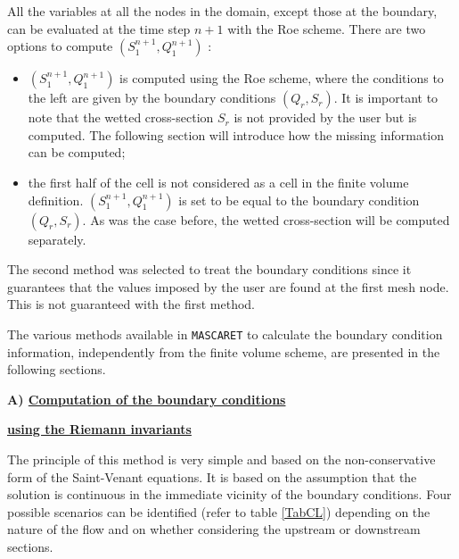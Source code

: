 All the variables at all the nodes in the domain, except those at the boundary, can be evaluated at the time step $n+1$ with the Roe scheme. There are two options to compute $(S_{1}^{n+1},Q_{1}^{n+1})$ :
\begin{itemize}
 \item $(S_{1}^{n+1},Q_{1}^{n+1})$ is computed using the Roe scheme, where the conditions to the left are given by the boundary conditions $(Q_r,S_r)$. It is important to note that the wetted cross-section $S_r$ is not provided by the user but is computed. The following section will introduce how the missing information can be computed;
 \item the first half of the cell is not considered as a cell in the finite volume definition. $(S_{1}^{n+1},Q_{1}^{n+1})$ is set to be equal to the boundary condition $(Q_r,S_r)$. As was the case before, the wetted cross-section will be computed separately.
\end{itemize}

\vspace{0.5cm}

The second method was selected to treat the boundary conditions since it guarantees that the values imposed by the user are found at the first mesh node. This is not guaranteed with the first method.

\vspace{0.5cm}

The various methods available in \texttt{MASCARET} to calculate the boundary condition information, independently from the finite volume scheme, are presented in the following sections.

\vspace{0.5cm}

\textbf{A) \underline{Computation of the boundary conditions}}

\hspace{0.7cm}\textbf{\underline{using the Riemann invariants}}

\vspace{0.5cm}

The principle of this method is very simple and based on the non-\linebreak conservative form of the Saint-Venant equations. It is based on the assumption that the solution is continuous in the immediate vicinity of the boundary conditions. Four possible scenarios can be identified (refer to table \ref{TabCL}) depending on the nature of the flow and on whether considering the upstream or downstream sections.

